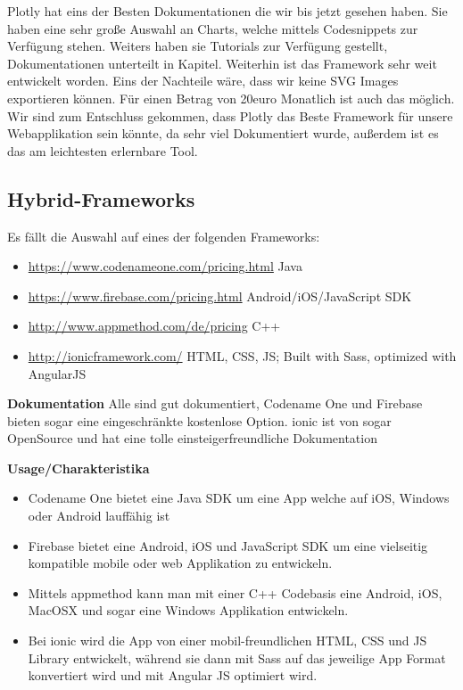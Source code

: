 Plotly hat eins der Besten Dokumentationen die wir bis jetzt gesehen haben. Sie haben eine sehr große Auswahl an Charts, welche mittels Codesnippets zur Verfügung stehen. 
Weiters haben sie Tutorials zur Verfügung gestellt, Dokumentationen unterteilt in Kapitel. Weiterhin ist das Framework sehr weit entwickelt worden.                  
Eins der Nachteile wäre, dass wir keine SVG Images exportieren können. Für einen Betrag von 20euro Monatlich ist auch das möglich. 
Wir sind zum Entschluss gekommen, dass Plotly das Beste Framework für unsere Webapplikation sein könnte, 
da sehr viel Dokumentiert wurde, außerdem ist es das am leichtesten erlernbare Tool.


\clearpage
\subsection{Hybrid-Frameworks}
Es fällt die Auswahl auf eines der folgenden Frameworks:
\begin{itemize}
\item \hyperref[Codename One]{https://www.codenameone.com/pricing.html} Java
\item \hyperref[Firebase]{https://www.firebase.com/pricing.html} Android/iOS/JavaScript SDK
\item \hyperref[appmethod]{http://www.appmethod.com/de/pricing} C++
\item \hyperref[ionic]{http://ionicframework.com/} HTML, CSS, JS; Built with Sass, optimized with AngularJS
\end{itemize}

\textbf{Dokumentation}
Alle sind gut dokumentiert, Codename One und Firebase bieten sogar eine eingeschränkte kostenlose Option.
ionic ist von sogar OpenSource und hat eine tolle einsteigerfreundliche Dokumentation

\textbf{Usage/Charakteristika}
\begin{itemize}
\item Codename One bietet eine Java SDK um eine App welche auf iOS, Windows oder Android lauffähig ist
\item Firebase bietet eine Android, iOS und JavaScript SDK um eine vielseitig kompatible mobile oder web Applikation zu entwickeln. 
\item Mittels appmethod kann man mit einer C++ Codebasis eine Android, iOS, MacOSX und sogar eine Windows Applikation entwickeln.
\item Bei ionic wird die App von einer mobil-freundlichen HTML, CSS und JS Library entwickelt, während sie dann mit Sass auf das jeweilige App Format konvertiert wird und mit Angular JS optimiert wird. 
\end{itemize}

